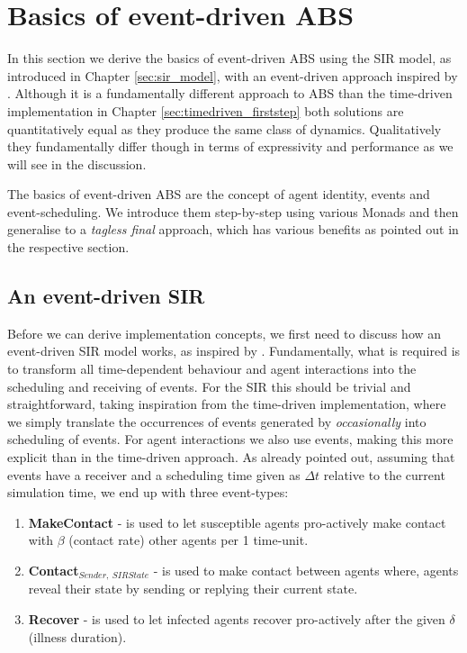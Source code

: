 \section{Basics of event-driven ABS}
In this section we derive the basics of event-driven ABS using the SIR model, as introduced in Chapter \ref{sec:sir_model}, with an event-driven approach inspired by \cite{macal_agent-based_2010}. Although it is a fundamentally different approach to ABS than the time-driven implementation in Chapter \ref{sec:timedriven_firststep} both solutions are quantitatively equal as they produce the same class of dynamics. Qualitatively they fundamentally differ though in terms of expressivity and performance as we will see in the discussion.

The basics of event-driven ABS are the concept of agent identity, events and event-scheduling. We introduce them step-by-step using various Monads and then generalise to a \textit{tagless final} approach, which has various benefits as pointed out in the respective section. 

\subsection{An event-driven SIR}
Before we can derive implementation concepts, we first need to discuss how an event-driven SIR model works, as inspired by \cite{macal_agent-based_2010}. Fundamentally, what is required is to transform all time-dependent behaviour and agent interactions into the scheduling and receiving of events. For the SIR this should be trivial and straightforward, taking inspiration from the time-driven implementation, where we simply translate the occurrences of events generated by \textit{occasionally} into scheduling of events. For agent interactions we also use events, making this more explicit than in the time-driven approach. As already pointed out, assuming that events have a receiver and a scheduling time given as $\Delta t$ relative to the current simulation time, we end up with three event-types:

\begin{enumerate}
	\item \textbf{MakeContact} - is used to let susceptible agents pro-actively make contact with $\beta$ (contact rate) other agents per 1 time-unit.
	\item \textbf{Contact$_{Sender, \ SIRState}$} - is used to make contact between agents where, agents reveal their state by sending or replying their current state.
	\item \textbf{Recover} - is used to let infected agents recover pro-actively after the given $\delta$ (illness duration). 
\end{enumerate}


